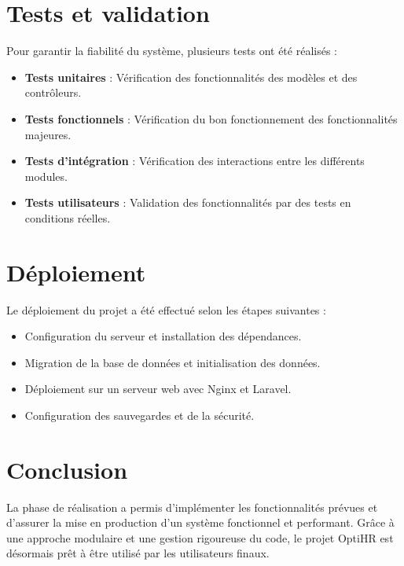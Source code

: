 \section{Tests et validation}
Pour garantir la fiabilité du système, plusieurs tests ont été réalisés :
\begin{itemize}
    \item \textbf{Tests unitaires} : Vérification des fonctionnalités des modèles et des contrôleurs.
    \item \textbf{Tests fonctionnels} : Vérification du bon fonctionnement des fonctionnalités majeures.
    \item \textbf{Tests d'intégration} : Vérification des interactions entre les différents modules.
    \item \textbf{Tests utilisateurs} : Validation des fonctionnalités par des tests en conditions réelles.
\end{itemize}

\section{Déploiement}
Le déploiement du projet a été effectué selon les étapes suivantes :
\begin{itemize}
    \item Configuration du serveur et installation des dépendances.
    \item Migration de la base de données et initialisation des données.
    \item Déploiement sur un serveur web avec Nginx et Laravel.
    \item Configuration des sauvegardes et de la sécurité.
\end{itemize}

\section{Conclusion}
La phase de réalisation a permis d'implémenter les fonctionnalités prévues et d'assurer la mise en production d'un système fonctionnel et performant. Grâce à une approche modulaire et une gestion rigoureuse du code, le projet OptiHR est désormais prêt à être utilisé par les utilisateurs finaux.
\clearpage
